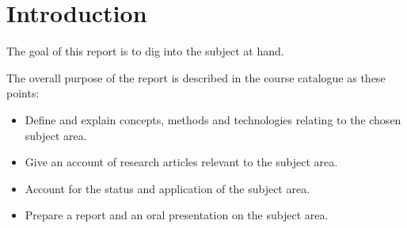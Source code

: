 \chapter{Introduction}
The goal of this report is to dig into the subject at hand.

The overall purpose of the report is described in the course catalogue as these points:
\begin{itemize}
\item Define and explain concepts, methods and technologies relating to the chosen subject area.
\item Give an account of research articles relevant to the subject area.
\item Account for the status and application of the subject area.
\item Prepare a report and an oral presentation on the subject area.
\end{itemize}
    
  
